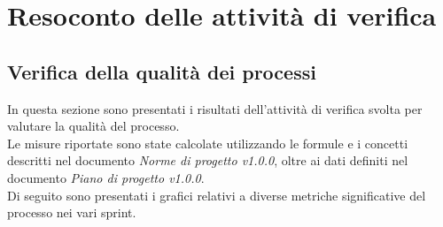 \newcommand{\Met}[4]{
    \subsubsection{#1}
    \begin{figure}[h!] \centering
        \texttt{[image: \#2]}
        \caption{Proiezione della#1nei vari periodi di progetto}
    \end{figure}
    \subsubsection*{RTB}
    #3
    \subsubsection*{PB}
    #4
    \newpage
}

\newcommand{\MetNoPB}[3]{
    \subsubsection{#1}
    \begin{figure}[h!] \centering
        \texttt{[image: \#2]}
        \caption{Proiezione della#1negli ultimi periodi di progetto}
    \end{figure}
    \subsubsection*{PB}
    #3
    \newpage
}

\section{Resoconto delle attività di verifica}

\subsection{Verifica della qualità dei processi}
In questa sezione sono presentati i risultati dell'attività di verifica svolta per valutare la qualità del processo.\\
Le misure riportate sono state calcolate utilizzando le formule e i concetti descritti nel documento \textit{Norme di progetto v1.0.0}, oltre ai dati definiti nel documento \textit{Piano di progetto v1.0.0}.\\
Di seguito sono presentati i grafici relativi a diverse metriche significative del processo nei vari sprint.

